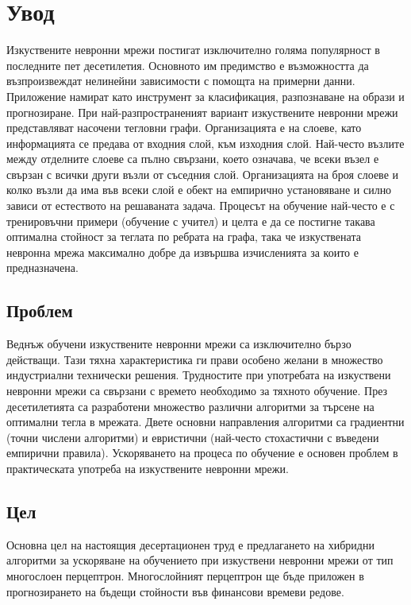 ﻿
\chapter*{Увод}

Изкуствените невронни мрежи постигат изключително голяма популярност в последните пет десетилетия. Основното им предимство е възможността да възпроизвеждат нелинейни зависимости с помощта на примерни данни. Приложение намират като инструмент за класификация, разпознаване на образи и прогнозиране. При най-разпространеният вариант изкуствените невронни мрежи представляват насочени тегловни графи. Организацията е на слоеве, като информацията се предава от входния слой, към изходния слой. Най-често възлите между отделните слоеве са пълно свързани, което означава, че всеки възел е свързан с всички други възли от съседния слой. Организацията на броя слоеве и колко възли да има във всеки слой е обект на емпирично установяване и силно зависи от естеството на решаваната задача. Процесът на обучение най-често е с тренировъчни примери (обучение с учител) и целта е да се постигне такава оптимална стойност за теглата по ребрата на графа, така че изкуствената невронна мрежа максимално добре да извършва изчисленията за които е предназначена. 

\section*{Проблем}

Веднъж обучени изкуствените невронни мрежи са изключително бързо действащи. Тази тяхна характеристика ги прави особено желани в множество индустриални технически решения. Трудностите при употребата на изкуствени невронни мрежи са свързани с времето необходимо за тяхното обучение. През десетилетията са разработени множество различни алгоритми за търсене на оптимални тегла в мрежата. Двете основни направления алгоритми са градиентни (точни числени алгоритми) и евристични (най-често стохастични с въведени емпирични правила). Ускоряването на процеса по обучение е основен проблем в практическата употреба на изкуствените невронни мрежи.

\section*{Цел}

Основна цел на настоящия десертационен труд е предлагането на хибридни алгоритми за ускоряване на обучението при изкуствени невронни мрежи от тип многослоен перцептрон. Многослойният перцептрон ще бъде приложен в прогнозирането на бъдещи стойности във финансови времеви редове. 


